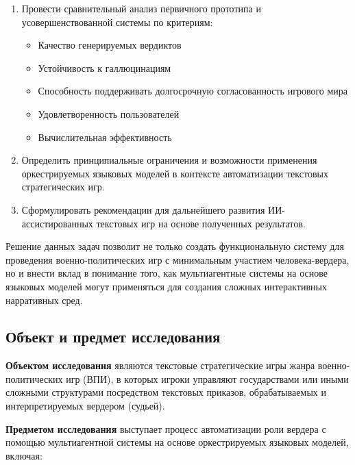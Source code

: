 \begin{enumerate}
    \item Провести сравнительный анализ первичного прототипа и усовершенствованной системы по критериям:
    \begin{itemize}
        \item Качество генерируемых вердиктов
        \item Устойчивость к галлюцинациям
        \item Способность поддерживать долгосрочную согласованность игрового мира
        \item Удовлетворенность пользователей
        \item Вычислительная эффективность
    \end{itemize}

    \item Определить принципиальные ограничения и возможности применения оркестрируемых языковых моделей в контексте автоматизации текстовых стратегических игр.

    \item Сформулировать рекомендации для дальнейшего развития ИИ-ассистированных текстовых игр на основе полученных результатов.
\end{enumerate}

Решение данных задач позволит не только создать функциональную систему для проведения военно-политических игр с минимальным участием человека-вердера, но и внести вклад в понимание того, как мультиагентные системы на основе языковых моделей могут применяться для создания сложных интерактивных нарративных сред.

\subsection*{Объект и предмет исследования}

\textbf{Объектом исследования} являются текстовые стратегические игры жанра военно-политических игр (ВПИ), в которых игроки управляют государствами или иными сложными структурами посредством текстовых приказов, обрабатываемых и интерпретируемых вердером (судьей).

\textbf{Предметом исследования} выступает процесс автоматизации роли вердера с помощью мультиагентной системы на основе оркестрируемых языковых моделей, включая:

